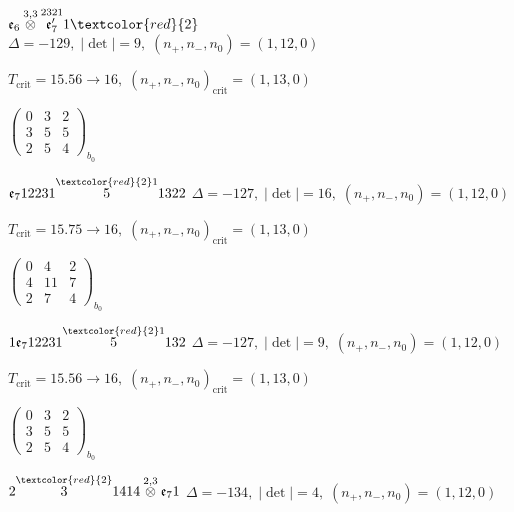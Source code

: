 \documentclass[10pt]{article}
\begin{document}
\smallskip

$\mathfrak{e}_6\overset{3,3}{\otimes}\overset{2321}{\mathfrak{e}_7'}1\textcolor{red}{2}$ \quad $\Delta=-129,\; |\det|=9,\; (n_+,n_-,n_0)=(1,12,0)$

\hspace{1em}$T_{\text{crit}}=15.56 \to 16,\; (n_+,n_-,n_0)_{\text{crit}}=(1,13,0)$

\hspace{2em}$\left(\begin{smallmatrix}0 & 3 & 2 \\ 3 & 5 & 5 \\ 2 & 5 & 4\end{smallmatrix}\right)_{\!b_0}$

\smallskip

$\mathfrak{e}_712231\overset{\textcolor{red}{2}1}{5}1322$ \quad $\Delta=-127,\; |\det|=16,\; (n_+,n_-,n_0)=(1,12,0)$

\hspace{1em}$T_{\text{crit}}=15.75 \to 16,\; (n_+,n_-,n_0)_{\text{crit}}=(1,13,0)$

\hspace{2em}$\left(\begin{smallmatrix}0 & 4 & 2 \\ 4 & 11 & 7 \\ 2 & 7 & 4\end{smallmatrix}\right)_{\!b_0}$

\smallskip

$1\mathfrak{e}_712231\overset{\textcolor{red}{2}1}{5}132$ \quad $\Delta=-127,\; |\det|=9,\; (n_+,n_-,n_0)=(1,12,0)$

\hspace{1em}$T_{\text{crit}}=15.56 \to 16,\; (n_+,n_-,n_0)_{\text{crit}}=(1,13,0)$

\hspace{2em}$\left(\begin{smallmatrix}0 & 3 & 2 \\ 3 & 5 & 5 \\ 2 & 5 & 4\end{smallmatrix}\right)_{\!b_0}$

\smallskip

$2\overset{\textcolor{red}{2}}{3}1414\overset{2,3}{\otimes}\mathfrak{e}_71$ \quad $\Delta=-134,\; |\det|=4,\; (n_+,n_-,n_0)=(1,12,0)$
\end{document}
